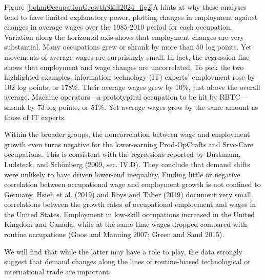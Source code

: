 \documentclass[12pt]{article}
\newcommand{\highlightP}[1]{{\emph{\color{MyPink}{#1}}}}
\theoremstyle{definition}
\begin{document}
Figure \ref{bohmOccupationGrowthSkill2024_fig2}A hints at why these analyses tend to have limited explanatory power, plotting changes in employment against changes in average wages over the 1985-2010 period for each occupation. Variation along the horizontal axis shows that employment changes are very substantial. Many occupations grew or shrank by more than $50$ log points. Yet movements of average wages are surprisingly small. \highlightP{Thus, between-occupation decompositions -- such as wage regressions with occupation dummies or reweighting strategies -- may attribute little of the trends of in wage inequality to factors like changing skill prices and employment structure and much of its increase to unexplained within-occupation inequality.} In fact, the regression line shows that employment and wage changes are uncorrelated. To pick the two highlighted examples, information technology (IT) experts' employment rose by $102$ log points, or $178\%$. Their average wages grew by $10\%$, just above the overall average. Machine operators—a prototypical occupation to be hit by RBTC—shrank by $73$ log points, or $51\%$. Yet average wages grew by the same amount as those of IT experts.

Within the broader groups, the noncorrelation between wage and employment growth even turns negative for the lower-earning Prod-OpCrafts and Srvc-Care occupations. This is consistent with the regressions reported by Dustmann, Ludsteck, and Schönberg (2009, sec. IV.D). They conclude that demand shifts were unlikely to have driven lower-end inequality. Finding little or negative correlation between occupational wage and employment growth is not confined to Germany. Hsieh et al. (2019) and Roys and Taber (2019) document very small correlations between the growth rates of occupational employment and wages in the United States. Employment in low-skill occupations increased in the United Kingdom and Canada, while at the same time wages dropped compared with routine occupations (Goos and Manning 2007; Green and Sand 2015). 

\highlightP{Next to the role that occupations have to play for wage inequality, this begets the more fundamental question of whether, on aggregate, shifts in demand versus supply of labor to different occupations were the dominant factor for the changes of the employment structure.} We will find that while the latter may have a role to play, the data strongly suggest that demand changes along the lines of routine-biased technological or international trade are important.
\end{document}
